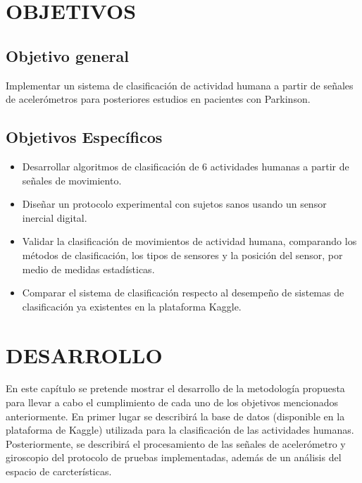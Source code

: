 \documentclass[11pt]{report}
\begin{document}
\chapter{OBJETIVOS}

\section{Objetivo general}
Implementar un sistema de clasificación de actividad humana a partir de señales de acelerómetros para posteriores estudios en pacientes con Parkinson.

\section{Objetivos Específicos}
\begin{itemize}
\item Desarrollar algoritmos de clasificación de 6 actividades humanas a partir de señales de movimiento.
\item Diseñar un protocolo experimental con sujetos sanos usando un sensor inercial digital.
\item Validar la clasificación de movimientos de actividad humana, comparando los métodos de clasificación, los tipos de sensores y la posición del sensor, por medio de medidas estadísticas.
\item Comparar el sistema de clasificación respecto al desempeño de sistemas de clasificación ya existentes en la plataforma Kaggle.
\end{itemize}


\chapter{DESARROLLO}
En este capítulo se pretende mostrar el desarrollo de la metodología propuesta para llevar a cabo el cumplimiento de cada uno de los objetivos mencionados anteriormente. En primer lugar se describirá la base de datos (disponible en la plataforma de Kaggle) utilizada para la clasificación de las actividades humanas. Posteriormente, se describirá el procesamiento de las señales de acelerómetro y giroscopio del protocolo de pruebas implementadas, además de un análisis del espacio de carcterísticas.
\end{document}
